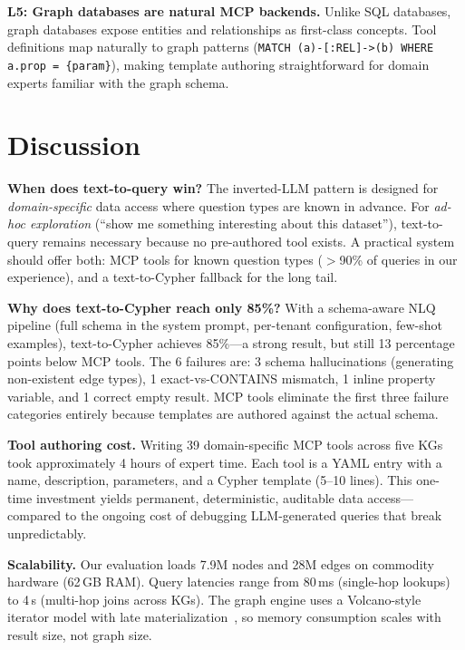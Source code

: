 \documentclass[sigconf]{acmart}
\begin{document}
\smallskip\noindent\textbf{L5: Graph databases are natural
MCP backends.}
Unlike SQL databases, graph databases expose entities and
relationships as first-class concepts.  Tool definitions
map naturally to graph patterns (\texttt{MATCH (a)-[:REL]->(b)
WHERE a.prop = \{param\}}), making template authoring
straightforward for domain experts familiar with the graph
schema.

\section{Discussion}\label{sec:discussion}

\smallskip\noindent\textbf{When does text-to-query win?}
The inverted-LLM pattern is designed for \emph{domain-specific}
data access where question types are known in advance.
For \emph{ad-hoc exploration} (``show me something interesting
about this dataset''), text-to-query remains necessary because
no pre-authored tool exists.  A practical system should offer
both: MCP tools for known question types ($>$90\% of queries in
our experience), and a text-to-Cypher fallback for the long tail.

\smallskip\noindent\textbf{Why does text-to-Cypher reach only 85\%?}
With a schema-aware NLQ pipeline (full schema in the system
prompt, per-tenant configuration, few-shot examples),
text-to-Cypher achieves 85\%---a strong result, but still
13 percentage points below MCP tools.  The 6 failures are:
3 schema hallucinations (generating non-existent edge types),
1 exact-vs-CONTAINS mismatch, 1 inline property variable,
and 1 correct empty result.  MCP tools eliminate the first
three failure categories entirely because templates are
authored against the actual schema.

\smallskip\noindent\textbf{Tool authoring cost.}
Writing 39 domain-specific MCP tools across five KGs took
approximately 4 hours of expert time.  Each tool is a YAML
entry with a name, description, parameters, and a Cypher
template (5--10 lines).  This one-time investment yields
permanent, deterministic, auditable data access---compared
to the ongoing cost of debugging LLM-generated queries that
break unpredictably.

\smallskip\noindent\textbf{Scalability.}
Our evaluation loads 7.9M nodes and 28M edges on commodity
hardware (62\,GB RAM).  Query latencies range from 80\,ms
(single-hop lookups) to 4\,s (multi-hop joins across KGs).
The graph engine uses a Volcano-style iterator model with
late materialization~\cite{mandarapu2026samyama}, so memory
consumption scales with result size, not graph size.
\end{document}
